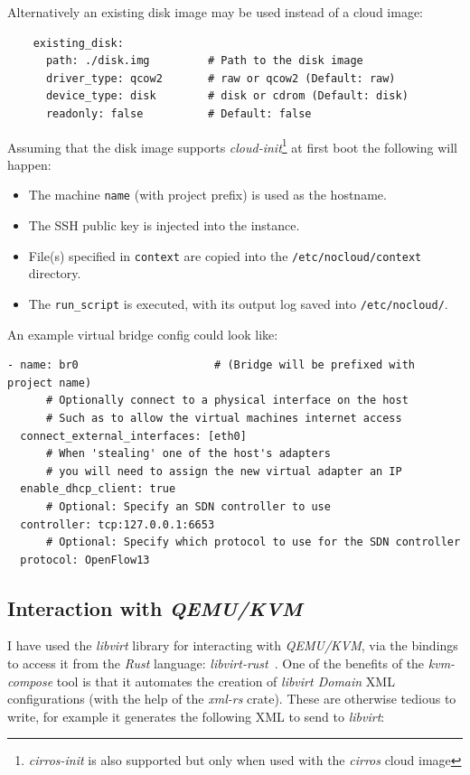 \documentclass[
    author={Jacob Daniel Halsey},
    supervisor={Prof. Awais Rashid},
    degree={BSc},
    title={Building a Testbed for Evaluating Privacy Enhancing Technologies  (PETs)},
    subtitle={},
    type={software development},
    year={2021}
]{dissertation}
\begin{document}
Alternatively an existing disk image may be used instead of a cloud image:

\begin{verbatim}
    existing_disk:
      path: ./disk.img         # Path to the disk image
      driver_type: qcow2       # raw or qcow2 (Default: raw)
      device_type: disk        # disk or cdrom (Default: disk)
      readonly: false          # Default: false
\end{verbatim}


Assuming that the disk image supports \emph{cloud-init}\footnote{
	\emph{cirros-init} is also supported but only when used with the \emph{cirros} cloud image
} at first boot the following will happen:

\begin{singlespace}
	\begin{itemize}
		\item The machine \texttt{name} (with project prefix) is used as the hostname.
		\item The SSH public key is injected into the instance.
		\item File(s) specified in \texttt{context} are copied into the \texttt{/etc/nocloud/context} directory.
		\item The \texttt{run\_script} is executed, with its output log saved into \texttt{/etc/nocloud/}.
	\end{itemize}
\end{singlespace}

An example virtual bridge config could look like:

\begin{verbatim}
- name: br0                     # (Bridge will be prefixed with project name)
      # Optionally connect to a physical interface on the host
      # Such as to allow the virtual machines internet access
  connect_external_interfaces: [eth0]
      # When 'stealing' one of the host's adapters 
      # you will need to assign the new virtual adapter an IP
  enable_dhcp_client: true
      # Optional: Specify an SDN controller to use
  controller: tcp:127.0.0.1:6653
      # Optional: Specify which protocol to use for the SDN controller
  protocol: OpenFlow13
\end{verbatim}

\subsection{Interaction with \emph{QEMU/KVM}}

I have used the \emph{libvirt} library for interacting with \emph{QEMU/KVM}, 
via the bindings to access it from the \emph{Rust} language: \emph{libvirt-rust}~\cite{libvirt_rust}.
One of the benefits of the \emph{kvm-compose} tool is that it automates the creation of \emph{libvirt Domain}
XML configurations (with the help of the \emph{xml-rs} crate). These are otherwise tedious to write, for 
example it generates the following XML to send to \emph{libvirt}:
\end{document}

